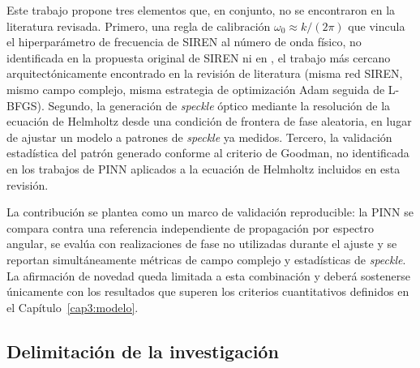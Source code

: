 Este trabajo propone tres elementos que, en conjunto, no se encontraron en la
literatura revisada. Primero, una regla de calibración
$\omega_0 \approx k/(2\pi)$ que vincula el hiperparámetro de frecuencia de
SIREN al número de onda físico, no identificada en la propuesta original de
SIREN \parencite{sitzmann2020siren} ni en
\textcite{panagiotakopoulos2026helmholtz}, el trabajo más cercano
arquitectónicamente encontrado en la revisión de literatura (misma red
SIREN, mismo campo complejo, misma estrategia de optimización Adam seguida
de L-BFGS). Segundo, la generación de \textit{speckle} óptico mediante la
resolución de la ecuación de Helmholtz desde una condición de
frontera de fase aleatoria, en lugar de ajustar un modelo a patrones de
\textit{speckle} ya medidos. Tercero, la validación estadística del patrón
generado conforme al criterio de Goodman, no identificada en los trabajos de
PINN aplicados a la ecuación de Helmholtz incluidos en esta revisión.

La contribución se plantea como un marco de validación reproducible: la PINN se
compara contra una referencia independiente de propagación por espectro angular,
se evalúa con realizaciones de fase no utilizadas durante el ajuste y se
reportan simultáneamente métricas de campo complejo y estadísticas de
\textit{speckle}. La afirmación de novedad queda limitada a esta combinación y
deberá sostenerse únicamente con los resultados que superen los criterios
cuantitativos definidos en el Capítulo~\ref{cap3:modelo}.

\subsection{Delimitación de la investigación}

